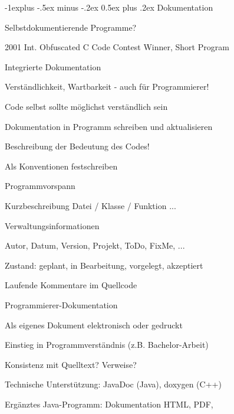 \documentclass[a4paper]{article}
\makeatletter
\renewcommand{\subsection}{\@startsection{subsection}{2}{0mm}%
                                {-1explus -.5ex minus -.2ex}%
                                {0.5ex plus .2ex}%
                                {\normalfont\normalsize\bfseries}}
\makeatother
\begin{document}
\begin{multicols}{3}
  \subsection{Dokumentation}
  \begin{itemize*}
    \item Selbstdokumentierende Programme?
    \begin{itemize*}
      \item 2001 Int. Obfuscated C Code Contest Winner, Short Program
    \end{itemize*}
  \end{itemize*}

  Integrierte Dokumentation
  \begin{itemize*}
    \item Verständlichkeit, Wartbarkeit - auch für Programmierer!
    \item Code selbst sollte möglichst verständlich sein
    \item Dokumentation in Programm schreiben und aktualisieren
    \item Beschreibung der Bedeutung des Codes!
    \item Als Konventionen festschreiben
    \item Programmvorspann
    \item Kurzbeschreibung Datei / Klasse / Funktion ...
    \item Verwaltungsinformationen
    \begin{itemize*}
      \item Autor, Datum, Version, Projekt, ToDo, FixMe, ...
      \item Zustand: geplant, in Bearbeitung, vorgelegt, akzeptiert
    \end{itemize*}
    \item Laufende Kommentare im Quellcode
  \end{itemize*}

  Programmierer-Dokumentation
  \begin{itemize*}
    \item Als eigenes Dokument elektronisch oder gedruckt
    \item Einstieg in Programmverständnis (z.B. Bachelor-Arbeit)
    \item Konsistenz mit Quelltext? Verweise?
    \item Technische Unterstützung: JavaDoc (Java), doxygen (C++)
    \item Ergänztes Java-Programm: Dokumentation HTML, PDF,
  \end{itemize*}


\end{multicols}
\end{document}
